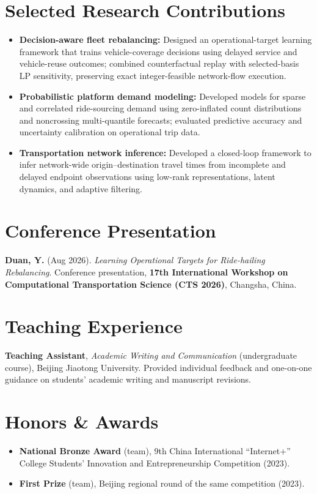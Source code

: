 \documentclass[10.6pt,letterpaper]{article}
\newcommand{\papertitle}[1]{\emph{#1}}
\begin{document}
\section*{Selected Research Contributions}
\begin{itemize}
\item \textbf{Decision-aware fleet rebalancing:} Designed an operational-target learning framework that trains vehicle-coverage decisions using delayed service and vehicle-reuse outcomes; combined counterfactual replay with selected-basis LP sensitivity, preserving exact integer-feasible network-flow execution.
\item \textbf{Probabilistic platform demand modeling:} Developed models for sparse and correlated ride-sourcing demand using zero-inflated count distributions and noncrossing multi-quantile forecasts; evaluated predictive accuracy and uncertainty calibration on operational trip data.
\item \textbf{Transportation network inference:} Developed a closed-loop framework to infer network-wide origin--destination travel times from incomplete and delayed endpoint observations using low-rank representations, latent dynamics, and adaptive filtering.
\end{itemize}

\section*{Conference Presentation}
\textbf{Duan, Y.} (Aug 2026). \papertitle{Learning Operational Targets for Ride-hailing Rebalancing}. Conference presentation, \textbf{17th International Workshop on Computational Transportation Science (CTS 2026)}, Changsha, China.

\section*{Teaching Experience}
\textbf{Teaching Assistant}, \emph{Academic Writing and Communication} (undergraduate course), Beijing Jiaotong University. Provided individual feedback and one-on-one guidance on students' academic writing and manuscript revisions.

\section*{Honors \& Awards}
\begin{itemize}
\item \textbf{National Bronze Award} (team), 9th China International ``Internet+'' College Students' Innovation and Entrepreneurship Competition (2023).
\item \textbf{First Prize} (team), Beijing regional round of the same competition (2023).
\end{itemize}
\end{document}

